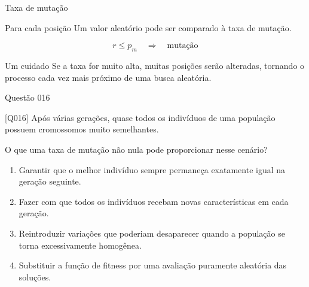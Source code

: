 \documentclass[xcolor=dvipsnames,table]{beamer}
\begin{document}
\begin{frame}{Taxa de mutação}

    \begin{block}{Para cada posição}
        Um valor aleatório pode ser comparado à taxa de mutação.
    \end{block}

    \begin{center}
        \Large
        \[
        r \leq p_m
        \quad\Longrightarrow\quad
        \text{mutação}
        \]
    \end{center}

    \begin{block}{Um cuidado}
        Se a taxa for muito alta, muitas posições serão alteradas,
        tornando o processo cada vez mais próximo de uma busca aleatória.
    \end{block}

\end{frame}

\begin{frame}{Questão 016}

    \begin{block}{[Q016]}
        Após várias gerações, quase todos os indivíduos de uma
        população possuem cromossomos muito semelhantes.

        O que uma taxa de mutação não nula pode proporcionar
        nesse cenário?
    \end{block}

    \begin{enumerate}[label=(\Alph*)]

        \item Garantir que o melhor indivíduo sempre permaneça
        exatamente igual na geração seguinte.

        \item Fazer com que todos os indivíduos recebam novas
        características em cada geração.

        \item Reintroduzir variações que poderiam desaparecer
        quando a população se torna excessivamente homogênea.

        \item Substituir a função de fitness por uma avaliação
        puramente aleatória das soluções.

    \end{enumerate}

\end{frame}

	\begin{frame}
		\titlepage
	\end{frame}
	
\end{document}
